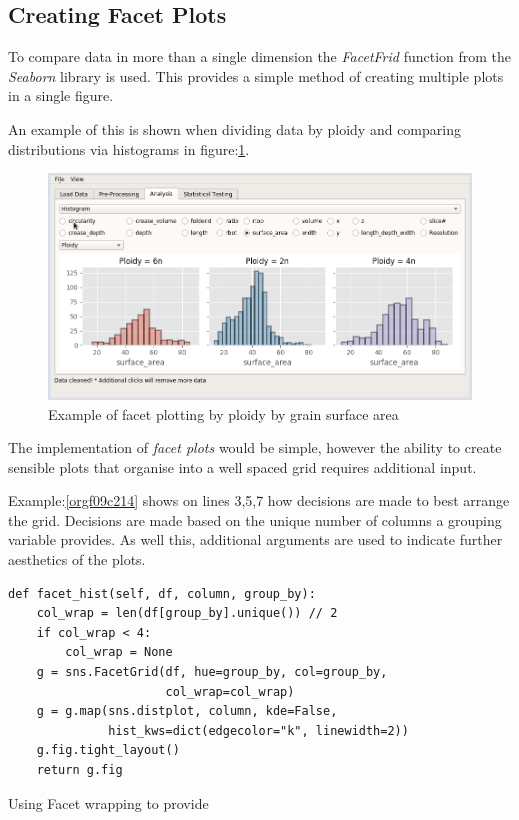 \documentclass[11pt]{report}
\begin{document}
\clearpage
\subsection{Creating Facet Plots}
\label{sec:org0098ef5}

To compare data in more than a single dimension the \emph{FacetFrid} function from the \emph{Seaborn} library is used. This provides a simple method of creating multiple plots in a single figure.

An example of this is shown when dividing data by ploidy and comparing distributions via histograms in figure:\ref{fig:orgc09f195}.

\begin{figure}[htbp]
\centering
\includegraphics[width=12cm]{./images/facet_example.png}
\caption{\label{fig:orgc09f195}
Example of facet plotting by ploidy by grain surface area}
\end{figure}

The implementation of \emph{facet plots} would be simple, however the ability to create sensible plots that organise into a well spaced grid requires additional input.

Example:\ref{orgf09c214} shows on lines 3,5,7 how decisions are made to best arrange the grid. Decisions are made based on the unique number of columns a grouping variable provides. As well this,  additional arguments are  used to indicate further aesthetics of the plots.

\begin{listing}[htbp]
\begin{verbatim}
def facet_hist(self, df, column, group_by):
    col_wrap = len(df[group_by].unique()) // 2
    if col_wrap < 4:
        col_wrap = None
    g = sns.FacetGrid(df, hue=group_by, col=group_by,
                      col_wrap=col_wrap)
    g = g.map(sns.distplot, column, kde=False,
              hist_kws=dict(edgecolor="k", linewidth=2))
    g.fig.tight_layout()
    return g.fig
\end{verbatim}
\caption{\label{orgf09c214}
Using Facet wrapping to provide}
\end{listing}
\end{document}
